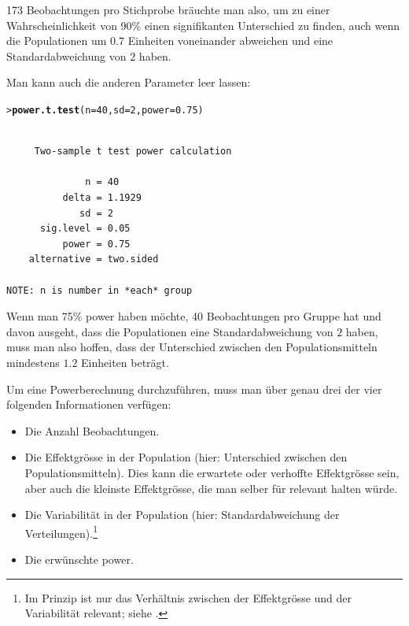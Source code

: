 \documentclass[oneside, 10pt]{book}\usepackage[]{graphicx}\usepackage[]{xcolor}
\makeatletter
\newcommand{\hlnum}[1]{\textcolor[rgb]{0.686,0.059,0.569}{#1}}%
\newcommand{\hlstd}[1]{\textcolor[rgb]{0.345,0.345,0.345}{#1}}%
\newcommand{\hlkwc}[1]{\textcolor[rgb]{0.333,0.667,0.333}{#1}}%
\newcommand{\hlkwd}[1]{\textcolor[rgb]{0.737,0.353,0.396}{\textbf{#1}}}%
\newenvironment{kframe}{%
 \def\at@end@of@kframe{}%
 \ifinner\ifhmode%
  \def\at@end@of@kframe{\end{minipage}}%
  \begin{minipage}{\columnwidth}%
 \fi\fi%
 \def\FrameCommand##1{\hskip\@totalleftmargin \hskip-\fboxsep
 \colorbox{shadecolor}{##1}\hskip-\fboxsep
     \hskip-\linewidth \hskip-\@totalleftmargin \hskip\columnwidth}%
 \MakeFramed {\advance\hsize-\width
   \@totalleftmargin\z@ \linewidth\hsize
   \@setminipage}}%
 {\par\unskip\endMakeFramed%
 \at@end@of@kframe}
\newenvironment{knitrout}{}{} %
\makeatother
\begin{document}
173 Beobachtungen pro Stichprobe bräuchte man also, um 
zu einer Wahrscheinlichkeit von 90\% 
einen signifikanten Unterschied zu finden, auch wenn die
Populationen um $0.7$ Einheiten voneinander abweichen und
eine Standardabweichung von $2$ haben.

Man kann auch die anderen Parameter leer lassen:
\begin{knitrout}
\color{fgcolor}\begin{kframe}
\begin{alltt}
\hlstd{> }\hlkwd{power.t.test}\hlstd{(}\hlkwc{n} \hlstd{=} \hlnum{40}\hlstd{,} \hlkwc{sd} \hlstd{=} \hlnum{2}\hlstd{,} \hlkwc{power} \hlstd{=} \hlnum{0.75}\hlstd{)}
\end{alltt}
\begin{verbatim}

     Two-sample t test power calculation 

              n = 40
          delta = 1.1929
             sd = 2
      sig.level = 0.05
          power = 0.75
    alternative = two.sided

NOTE: n is number in *each* group
\end{verbatim}
\end{kframe}
\end{knitrout}

Wenn man 75\% power haben möchte, 40 Beobachtungen pro Gruppe
hat und davon ausgeht, dass die Populationen eine Standardabweichung
von $2$ haben, muss man also hoffen, dass der Unterschied zwischen
den Populationsmitteln mindestens $1.2$ Einheiten beträgt.

Um eine Powerberechnung durchzuführen, muss man über 
genau drei der vier folgenden Informationen verfügen:
\begin{itemize}
  \item Die Anzahl Beobachtungen.
  
  \item Die Effektgrösse in der Population 
  (hier: Unterschied zwischen den Populationsmitteln).
  Dies kann die erwartete oder verhoffte Effektgrösse sein,
  aber auch die kleinste Effektgrösse, die man selber
  für relevant halten würde.
  
  \item Die Variabilität in der Population 
  (hier: Standardabweichung der Verteilungen).\footnote{Im Prinzip ist 
  nur das Verhältnis zwischen der Effektgrösse
  und der Variabilität relevant; siehe \citet{Cohen1977,Cohen1992}.}
 
  \item Die erwünschte power.
\end{itemize}
\end{document}

